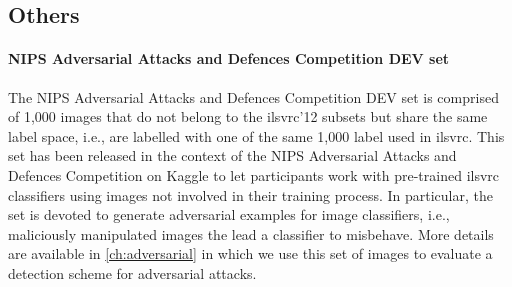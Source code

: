 \subsection{Others}

\paragraph{NIPS Adversarial Attacks and Defences Competition DEV set~\cite{kurakin2018adversarial}}
The NIPS Adversarial Attacks and Defences Competition DEV set is comprised of 1,000 images that do not belong to the \gls{ilsvrc}'12 subsets but share the same label space, i.e., are labelled with one of the same 1,000 label used in \gls{ilsvrc}.
This set has been released in the context of the NIPS Adversarial Attacks and Defences Competition on Kaggle to let participants work with pre-trained \gls{ilsvrc} classifiers using images not involved in their training process.
In particular, the set is devoted to generate adversarial examples for image classifiers, i.e., maliciously manipulated images the lead a classifier to misbehave.
More details are available in \ref{ch:adversarial} in which we use this set of images to evaluate a detection scheme for adversarial attacks.
